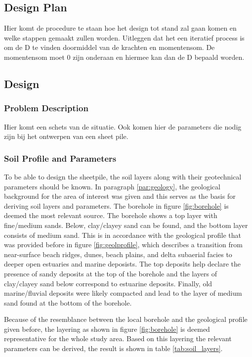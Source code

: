 \subsection{Design Plan}

Hier komt de procedure te staan hoe het design tot stand zal gaan komen en welke stappen gemaakt zullen worden. Uitleggen dat het een iteratief process is om de D te vinden doormiddel van de krachten en momentensom. De momentensom moet 0 zijn onderaan en hiermee kan dan de D bepaald worden. 

\subsection{Design}

\subsubsection{Problem Description}

Hier komt een schets van de situatie. Ook komen hier de parameters die nodig zijn bij het ontwerpen van een sheet pile.

\subsubsection{Soil Profile and Parameters}
To be able to design the sheetpile, the soil layers along with their geotechnical parameters should be known. In paragraph \ref{par:geology}, the geological background for the area of interest was given and this serves as the basis for deriving soil layers and parameters. The borehole in figure \ref{fig:borehole} is deemed the most relevant source. The borehole shows a top layer with fine/medium sands. Below, clay/clayey sand can be found, and the bottom layer consists of medium sand. This is in accordance with the geological profile that was provided before in figure \ref{fig:geolprofile}, which describes a transition from near-surface beach ridges, dunes, beach plains, and delta subaerial facies to deeper open estuaries and marine deposists. The top deposits help declare the presence of sandy deposits at the top of the borehole and the layers of clay/clayey sand below correspond to estuarine deposits. Finally, old marine/fluvial deposits were likely compacted and lead to the layer of medium sand found at the bottom of the borehole.

Because of the resemblance between the local borehole and the geological profile given before, the layering as shown in figure \ref{fig:borehole} is deemed representative for the whole study area. Based on this layering the relevant parameters can be derived, the result is shown in table \ref{tab:soil_layers}.

